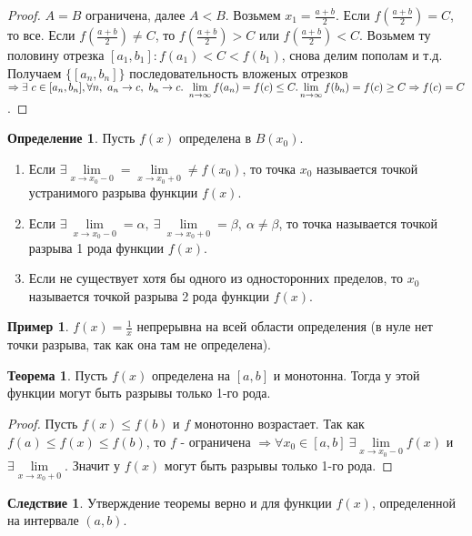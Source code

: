 \documentclass[a4paper, 12pt]{article}
\newcommand{\lims}{\lim\limits_{n\to \infty}}
\theoremstyle{definition}
\newtheorem*{definition}{Определение}
\newtheorem*{theorem}{Теорема}
\newtheorem*{consequense}{Следствие}
\newtheorem*{example}{Пример}
\begin{document}
        \begin{proof}
            $A=B$ ограничена, далее $A<B$. Возьмем $x_1=\frac{a+b}{2}$. Если $f(\frac{a+b}{2})=C$, то все. Если $f(\frac{a+b}{2})\ne C$, то $f(\frac{a+b}{2})>C$ или $f(\frac{a+b}{2})<C$. Возьмем ту половину отрезка $[a_1,b_1]: f(a_1)<C<f(b_1)$, снова делим пополам и т.д. Получаем $\{[a_n,b_n]\}$ последовательность вложеных отрезков $\Rightarrow \exists\ c\in [a_n,b_n],\\
            \forall n,\ a_n\to c,\ b_n\to c.\ \lims f(a_n)=f(c)\leq C. \lims f(b_n)=f(c)\geq C\\
            \Rightarrow f(c)=C$. 
        \end{proof} 
        \begin{definition}
            Пусть $f(x)$ определена в $B(x_0)$.
            \begin{enumerate}
                \item Если $\exists \lim\limits_{x\to x_0-0}=\lim\limits_{x\to x_0+0}\ne f(x_0)$, то  точка $x_0$ называется точкой устранимого разрыва функции $f(x)$.
                \item Если $\exists\ \lim\limits_{x\to x_0-0}=\alpha,\ \exists\ \lim\limits_{x\to x_0+0}=\beta,\ \alpha\ne \beta$, то точка называется точкой разрыва 1 рода функции $f(x)$.
                \item Если не существует хотя бы одного из односторонних пределов, то $x_0$ называется точкой разрыва 2 рода функции $f(x)$.
            \end{enumerate}
        \end{definition} 
        \begin{example}
            $f(x)=\frac{1}{x}$ непрерывна на всей области определения (в нуле нет точки разрыва, так как она там не определена).
        \end{example}
        \begin{theorem}
            Пусть $f(x)$ определена на $[a,b]$ и монотонна. Тогда у этой функции могут быть разрывы только 1-го рода.
        \end{theorem} 
        \begin{proof}
            Пусть $f(x)\leq f(b)$ и $f$ монотонно возрастает. Так как $f(a)\leq f(x)\leq f(b)$, то $f$ - ограничена $\Rightarrow \forall x_0\in [a,b]\ \exists \lim\limits_{x\to x_0-0}f(x)$ и $\exists \lim\limits_{x\to x_0+0}$. Значит у $f(x)$ могут быть разрывы только 1-го рода.
        \end{proof}
        \begin{consequense}
            Утверждение теоремы верно и для функции $f(x)$, определенной на интервале $(a,b)$.
        \end{consequense} 
\end{document}
